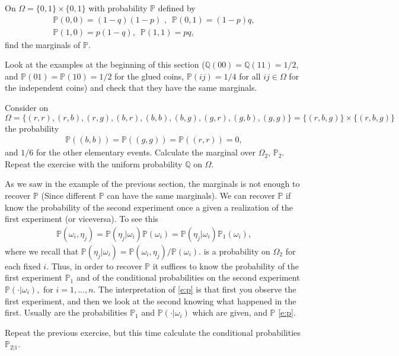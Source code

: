 \documentclass[12pt]{article}
\newcommand{\<}{{\langle \!\! \langle}}
\renewcommand{\>}{{\rangle \!\! \rangle}}
\newcommand{\bel}[2]{\begin{equation} \label{#1} \begin{split} #2
 					\end{split} \end{equation}}
\begin{document}
\begin{ExerciseList}

\Exercise
On $\Omega=\{0,1\}\times\{0,1\}$ with probability $\mathbb{P}$ defined by
\bel{}{\mathbb{P}(0,0)=(1-q)(1-p)\,\,,\,\,\,\mathbb{P}(0,1)=(1-p)q,\\ \mathbb{P}(1,0)=p(1-q),\,\,\,\mathbb{P}(1,1)=pq,}
find the marginals of $\mathbb{P}$.

\Exercise Look at the examples at the beginning of this section 
($\mathbb{Q}(00)=\mathbb{Q}(11)=1/2$, and $\mathbb{P}(01)=\mathbb{P}(10)=1/2$ for the glued coins, $\mathbb{P}(ij)= 1/4$ for all $ij\in\Omega$ for the independent coins) 
and check that they have the same marginals.

\Exercise
Consider on $\Omega=\{(r,r),(r,b),(r,g), (b,r),(b,b),(b,g),(g,r),(g,b),(g,g)\}=\{(r,b,g)\}\times\{(r,b,g)\}$ the probability 
\bel{}{\mathbb{P}((b,b))=\mathbb{P}((g,g)) = \mathbb{P}((r,r))=0,} and $1/6$ for the other elementary events.  Calculate the marginal over $\Omega_2$, $\mathbb{P}_2$.
Repeat the exercise with the uniform probability $\mathbb{Q}$ on $\Omega$.

\end{ExerciseList}

As we saw in the example of the previous section, the marginals is not enough to recover $\mathbb{P}$ (Since different $\mathbb{P}$ can have the same marginals). We can recover $\mathbb{P}$ if  know the probability of the second experiment once a given a realization of the first experiment (or viceversa).
To see this
\bel{e:p}{\mathbb{P}(\omega_i,\eta_j) = \mathbb{P}(\eta_j|\omega_i)\mathbb{P}(\omega_i) = \mathbb{P}(\eta_j|\omega_i)\mathbb{P}_1(\omega_i),}
 where we recall that $\mathbb{P}(\eta_j| \omega_i) = \mathbb{P}(\omega_i,\eta_j)/\mathbb{P}(\omega_i).$ is a probability on $\Omega_2$ for each fixed $i$. 
 Thus, in order to recover $\mathbb{P}$ it suffices to know the probability of the first experiment $\mathbb{P}_1$ and of the conditional probabilities on the second experiment $\mathbb{P}(\cdot | \omega_i),$ for $i=1,...,n$. 
 The interpretation of \eqref{e:p} is that first you observe the first experiment, and then we look at the second knowing what happened in the first. Usually are the probabilities $\mathbb{P}_1$ and $\mathbb{P}(\cdot | \omega_i)$ which are given, and $\mathbb{P}$ \eqref{e:p}.
 
\begin{ExerciseList}
\Exercise Repeat the previous exercise, but this time calculate the conditional probabilities $\mathbb{P}_{2|1}$.
\end{ExerciseList}
\end{document}
